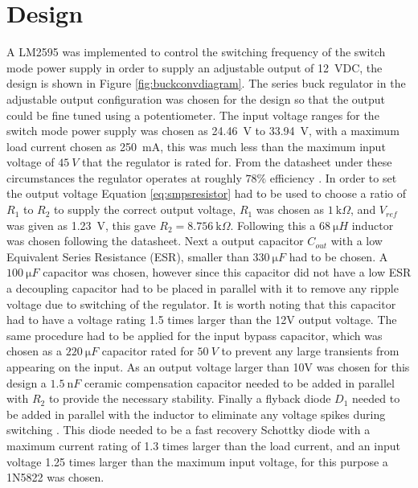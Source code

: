 \section{Design} \label{sec:design_switchmode}
A LM2595 was implemented to control the switching frequency of the switch mode power supply in order to supply an adjustable output of \SI{12}{VDC}, the design is shown in Figure \ref{fig:buckconvdiagram}. The series buck regulator in the adjustable output configuration was chosen for the design so that the output could be fine tuned using a potentiometer. \newline
The input voltage ranges for the switch mode power supply was chosen as \SI{24.46}{V} to \SI{33.94}{V}, with a maximum load current chosen as \SI{250}{\milli A}, this was much less than the maximum input voltage of $\SI{45}{V}$ that the regulator is rated for. From the datasheet under these circumstances the regulator operates at roughly $78\%$ efficiency \cite{lm2593:2013}.\newline
In order to set the output voltage Equation \ref{eq:smpsresistor} had to be used to choose a ratio of $R_{1}$ to $R_{2}$ to supply the correct output voltage, $R_{1}$ was chosen as $\SI{1}{\kilo \Omega}$, and $V_{ref}$ was given as \SI{1.23}{V}, this gave $R_{2}=\SI{8.756}{\kilo \Omega}$. Following this a $\SI{68}{\micro H}$ inductor was chosen following the datasheet. Next a output capacitor $C_{out}$ with a low Equivalent Series Resistance (ESR), smaller than $\SI{330}{\micro F}$ had to be chosen.\newline 
A $\SI{100}{\micro F}$ capacitor was chosen, however since this capacitor did not have a low ESR a decoupling capacitor had to be placed in parallel with it to remove any ripple voltage due to switching of the regulator. It is worth noting that this capacitor had to have a voltage rating 1.5 times larger than the 12V output voltage. The same procedure had to be applied for the input bypass capacitor, which was chosen as a $\SI{220}{\micro F}$ capacitor rated for $\SI{50}{V}$ to prevent any large transients from appearing on the input. \newline
As an output voltage larger than 10V was chosen for this design a $\SI{1.5}{\nano F}$ ceramic compensation capacitor needed to be added in parallel with $R_{2}$ to provide the necessary stability. Finally a flyback diode $D_1$ needed to be added in parallel with the inductor to eliminate any voltage spikes during switching \cite{WebsiteFlyback}. This diode needed to be a fast recovery Schottky diode with a maximum current rating of 1.3 times larger than the load current, and an input voltage 1.25 times larger than the maximum input voltage, for this purpose a 1N5822 was chosen.

